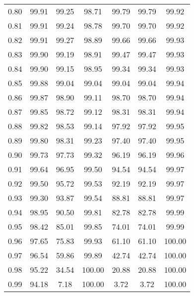 \begin{tabular}{|c|c|c|c|c|c|c|}
      0.80 &     99.91 &     99.25 &      98.71 &   99.79 &      99.79 &         99.92 \\
      0.81 &     99.91 &     99.24 &      98.78 &   99.70 &      99.70 &         99.92 \\
      0.82 &     99.91 &     99.27 &      98.89 &   99.66 &      99.66 &         99.93 \\
      0.83 &     99.90 &     99.19 &      98.91 &   99.47 &      99.47 &         99.93 \\
      0.84 &     99.90 &     99.15 &      98.95 &   99.34 &      99.34 &         99.93 \\
      0.85 &     99.88 &     99.04 &      99.04 &   99.04 &      99.04 &         99.94 \\
      0.86 &     99.87 &     98.90 &      99.11 &   98.70 &      98.70 &         99.94 \\
      0.87 &     99.85 &     98.72 &      99.12 &   98.31 &      98.31 &         99.94 \\
      0.88 &     99.82 &     98.53 &      99.14 &   97.92 &      97.92 &         99.95 \\
      0.89 &     99.80 &     98.31 &      99.23 &   97.40 &      97.40 &         99.95 \\
      0.90 &     99.73 &     97.73 &      99.32 &   96.19 &      96.19 &         99.96 \\
      0.91 &     99.64 &     96.95 &      99.50 &   94.54 &      94.54 &         99.97 \\
      0.92 &     99.50 &     95.72 &      99.53 &   92.19 &      92.19 &         99.97 \\
      0.93 &     99.30 &     93.87 &      99.54 &   88.81 &      88.81 &         99.97 \\
      0.94 &     98.95 &     90.50 &      99.81 &   82.78 &      82.78 &         99.99 \\
      0.95 &     98.42 &     85.01 &      99.85 &   74.01 &      74.01 &         99.99 \\
      0.96 &     97.65 &     75.83 &      99.93 &   61.10 &      61.10 &        100.00 \\
      0.97 &     96.54 &     59.86 &      99.89 &   42.74 &      42.74 &        100.00 \\
      0.98 &     95.22 &     34.54 &     100.00 &   20.88 &      20.88 &        100.00 \\
      0.99 &     94.18 &      7.18 &     100.00 &    3.72 &       3.72 &        100.00 \\
\bottomrule
\end{tabular}
